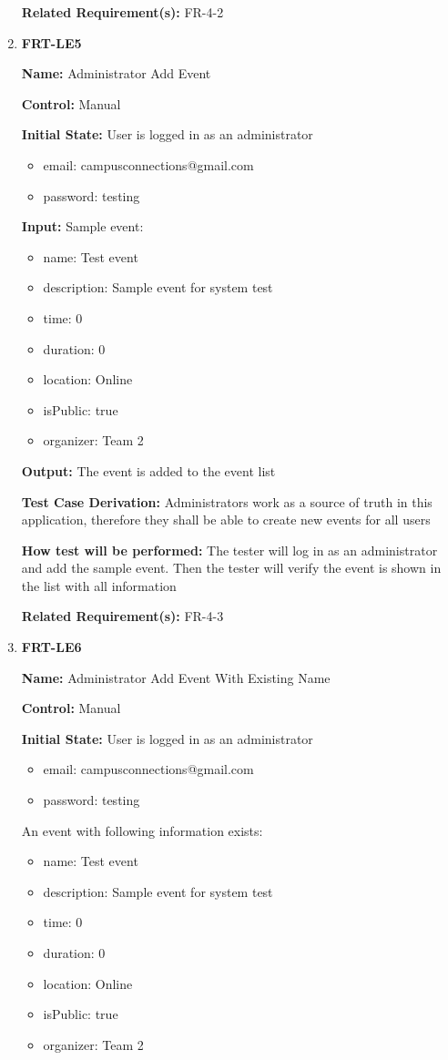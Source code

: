 \documentclass[12pt, titlepage]{article}
\begin{document}
\begin{enumerate}
\textbf{Related Requirement(s):} FR-4-2

\item{\textbf{FRT-LE5}}

\textbf{Name:} Administrator Add Event

\textbf{Control:} Manual
					
\textbf{Initial State:} User is logged in as an administrator
\begin{itemize}
\item email: campusconnections@gmail.com
\item password: testing
\end{itemize}

\textbf{Input:} Sample event:
\begin{itemize}
\item name: Test event
\item description: Sample event for system test
\item time: 0
\item duration: 0
\item location: Online
\item isPublic: true
\item organizer: Team 2
\end{itemize}
					
\textbf{Output:} The event is added to the event list

\textbf{Test Case Derivation:} Administrators work as a source of truth in this application, therefore they shall be able to create new events for all users
					
\textbf{How test will be performed:} The tester will log in as an administrator and add the sample event. Then the tester will verify the event is shown in the list with all information

\textbf{Related Requirement(s):} FR-4-3

\item{\textbf{FRT-LE6}}

\textbf{Name:} Administrator Add Event With Existing Name

\textbf{Control:} Manual
					
\textbf{Initial State:} User is logged in as an administrator
\begin{itemize}
\item email: campusconnections@gmail.com
\item password: testing
\end{itemize}

An event with following information exists:
\begin{itemize}
\item name: Test event
\item description: Sample event for system test
\item time: 0
\item duration: 0
\item location: Online
\item isPublic: true
\item organizer: Team 2
\end{itemize}


\end{enumerate}
\end{document}
